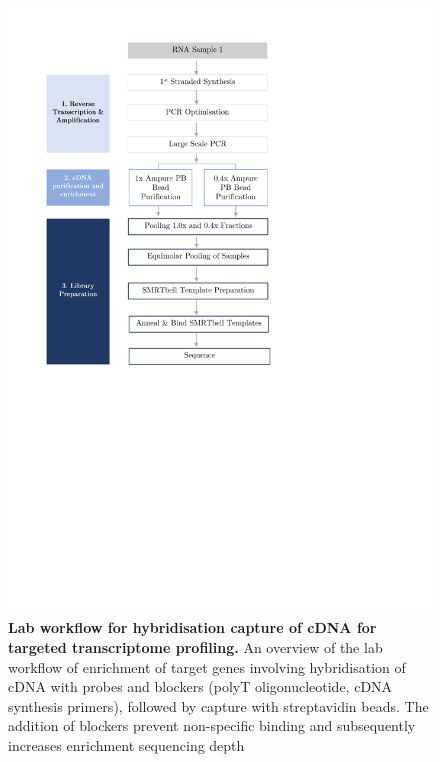 \begin{figure}[!h]
	\begin{center}
		\includegraphics[page=12,trim={0cm 6cm 0cm 1cm},clip,scale = 0.70]{Figures/ProjectDevelopment_Figures.pdf}
	\end{center}
	\captionsetup{width=0.95\textwidth}
	\caption[Lab workflow for hybridisation capture of cDNA for targeted transcriptome profiling]%
	{\textbf{Lab workflow for hybridisation capture of cDNA for targeted transcriptome profiling.} An overview of the lab workflow of enrichment of target genes involving hybridisation of cDNA with probes and blockers (polyT oligonucleotide, cDNA synthesis primers), followed by capture with streptavidin beads. The addition of blockers prevent non-specific binding and subsequently increases enrichment sequencing depth}
	\label{fig:isoseq_targetcapture}
\end{figure}

